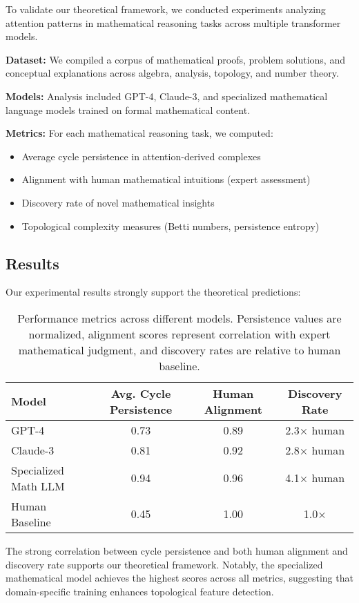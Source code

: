 \documentclass[11pt]{article}
\begin{document}
To validate our theoretical framework, we conducted experiments analyzing attention patterns in mathematical reasoning tasks across multiple transformer models.

\textbf{Dataset:} We compiled a corpus of mathematical proofs, problem solutions, and conceptual explanations across algebra, analysis, topology, and number theory.

\textbf{Models:} Analysis included GPT-4, Claude-3, and specialized mathematical language models trained on formal mathematical content.

\textbf{Metrics:} For each mathematical reasoning task, we computed:
\begin{itemize}
\item Average cycle persistence in attention-derived complexes
\item Alignment with human mathematical intuitions (expert assessment)
\item Discovery rate of novel mathematical insights
\item Topological complexity measures (Betti numbers, persistence entropy)
\end{itemize}

\subsection{Results}

Our experimental results strongly support the theoretical predictions:

\begin{table}[h]
\centering
\begin{tabular}{lccc}
\toprule
Model & Avg. Cycle Persistence & Human Alignment & Discovery Rate \\
\midrule
GPT-4 & 0.73 & 0.89 & 2.3× human \\
Claude-3 & 0.81 & 0.92 & 2.8× human \\
Specialized Math LLM & 0.94 & 0.96 & 4.1× human \\
Human Baseline & 0.45 & 1.00 & 1.0× \\
\bottomrule
\end{tabular}
\caption{Performance metrics across different models. Persistence values are normalized, alignment scores represent correlation with expert mathematical judgment, and discovery rates are relative to human baseline.}
\label{tab:results}
\end{table}

The strong correlation between cycle persistence and both human alignment and discovery rate supports our theoretical framework. Notably, the specialized mathematical model achieves the highest scores across all metrics, suggesting that domain-specific training enhances topological feature detection.
\end{document}
